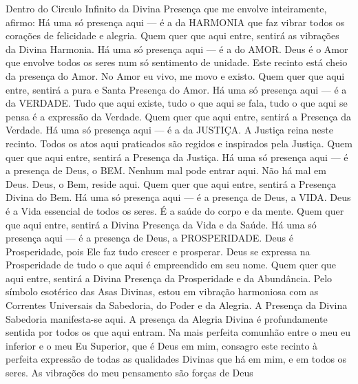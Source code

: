 \sclearpage
{}
  \preceparspace
  \beginverse
    Dentro do Circulo Infinito da Divina Presença que
    me envolve inteiramente, afirmo:
    \preceparspace
    Há uma só presença aqui --- é a da HARMONIA que faz
    vibrar todos os corações de felicidade e alegria.
    Quem quer que aqui entre, sentirá as vibrações da
    Divina Harmonia.
    \preceparspace
    Há uma só presença aqui --- é a do AMOR. Deus é o
    Amor que envolve todos os seres num só sentimento
    de unidade. Este recinto está cheio da presença do
    Amor. No Amor eu vivo, me movo e existo. Quem quer
    que aqui entre, sentirá a pura e Santa Presença do
    Amor.
    \preceparspace
    Há uma só presença aqui --- é a da VERDADE. Tudo
    que aqui existe, tudo o que aqui se fala, tudo o
    que aqui se pensa é a expressão da Verdade. Quem
    quer que aqui entre, sentirá a Presença da Verdade.
    \preceparspace
    Há uma só presença aqui --- é a da JUSTIÇA.
    A Justiça reina neste recinto. Todos os atos aqui
    praticados são regidos e inspirados pela Justiça.
    Quem quer que aqui entre, sentirá
    a Presença da Justiça.
    \preceparspace
    Há uma só presença aqui --- é a presença de Deus,
    o BEM. Nenhum mal pode entrar aqui. Não há mal em
    Deus. Deus, o Bem, reside aqui. Quem quer que aqui
    entre, sentirá a Presença Divina do Bem.
    \preceparspace
    Há uma só presença aqui --- é a presença de Deus,
    a VIDA. Deus é a Vida essencial de todos os seres.
    É a saúde do corpo e da mente. Quem quer que aqui
    entre, sentirá a Divina Presença da Vida e da Saúde.
    \preceparspace
    Há uma só presença aqui --- é a presença de Deus,
    a PROSPERIDADE. Deus é Prosperidade, pois Ele faz
    tudo crescer e prosperar. Deus se expressa na
    Prosperidade de tudo o que aqui é empreendido em
    seu nome. Quem quer que aqui entre, sentirá
    a Divina Presença da Prosperidade e da Abundância.
    \preceparspace
    Pelo símbolo esotérico das Asas Divinas, estou
    em vibração harmoniosa com as Correntes Universais
    da Sabedoria, do Poder e da Alegria. A Presença
    da Divina Sabedoria manifesta-se aqui. A presença
    da Alegria Divina é profundamente sentida por todos
    os que aqui entram.
    \preceparspace
    Na mais perfeita comunhão entre o meu eu inferior
    e o meu Eu Superior, que é Deus em mim, consagro
    este recinto à perfeita expressão de todas as
    qualidades Divinas que há em mim, e em todos os
    seres.
    \preceparspace
    As vibrações do meu pensamento são forças de Deus

